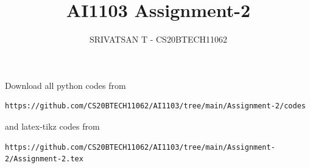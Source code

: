 \documentclass[journal,12pt,twocolumn]{IEEEtran}
\DeclareMathOperator*{\Res}{Res}
\begin{document}
\newcommand{\BEQA}{\begin{eqnarray}}
        \newcommand{\EEQA}{\end{eqnarray}}
\newcommand{\define}{\stackrel{\triangle}{=}}

\raggedbottom
\setlength{\parindent}{0pt}
\providecommand{\mbf}{\mathbf}
\providecommand{\pr}[1]{\ensuremath{\Pr\left(#1\right)}}
\providecommand{\qfunc}[1]{\ensuremath{Q\left(#1\right)}}
\providecommand{\sbrak}[1]{\ensuremath{{}\left[#1\right]}}
\providecommand{\lsbrak}[1]{\ensuremath{{}\left[#1\right.}}
\providecommand{\rsbrak}[1]{\ensuremath{{}\left.#1\right]}}
\providecommand{\brak}[1]{\ensuremath{\left(#1\right)}}
\providecommand{\lbrak}[1]{\ensuremath{\left(#1\right.}}
\providecommand{\rbrak}[1]{\ensuremath{\left.#1\right)}}
\providecommand{\cbrak}[1]{\ensuremath{\left\{#1\right\}}}
\providecommand{\lcbrak}[1]{\ensuremath{\left\{#1\right.}}
\providecommand{\rcbrak}[1]{\ensuremath{\left.#1\right\}}}
\theoremstyle{remark}
\newtheorem{rem}{Remark}
\newcommand{\sgn}{\mathop{\mathrm{sgn}}}
\providecommand{\abs}[1]{\vert#1\vert}
\providecommand{\res}[1]{\Res\displaylimits_{#1}}
\providecommand{\norm}[1]{\lVert#1\rVert}
\providecommand{\mtx}[1]{\mathbf{#1}}
\providecommand{\mean}[1]{E[#1]}
\providecommand{\fourier}{\overset{\mathcal{F}}{ \rightleftharpoons}}
\providecommand{\system}{\overset{\mathcal{H}}{ \longleftrightarrow}}
\newcommand{\solution}{\noindent \textbf{Solution: }}
\newcommand{\cosec}{\,\text{cosec}\,}
\newcommand{\comb}[2]{{}^{#1}\mathrm{C}_{#2}}
\providecommand{\dec}[2]{\ensuremath{\overset{#1}{\underset{#2}{\gtrless}}}}
\newcommand{\myvec}[1]{\ensuremath{\begin{pmatrix}#1\end{pmatrix}}}
\newcommand{\mydet}[1]{\ensuremath{\begin{vmatrix}#1\end{vmatrix}}}
\makeatletter
{}
\makeatother
\let\StandardTheFigure\thefigure
\let\vec\mathbf
\renewcommand{\thefigure}{\theproblem}
\def\putbox#1#2#3{\makebox[0in][l]{\makebox[#1][l]{}\raisebox{\baselineskip}[0in][0in]{\raisebox{#2}[0in][0in]{#3}}}}
\def\rightbox#1{\makebox[0in][r]{#1}}
\def\centbox#1{\makebox[0in]{#1}}
\def\topbox#1{\raisebox{-\baselineskip}[0in][0in]{#1}}
\def\midbox#1{\raisebox{-0.5\baselineskip}[0in][0in]{#1}}
\vspace{3cm}
\title{AI1103 Assignment-2}
\author{SRIVATSAN T - CS20BTECH11062}
\maketitle
\newpage
\bigskip
\renewcommand{\thefigure}{\theenumi}
\renewcommand{\thetable}{\theenumi}
Download all python codes from
\begin{lstlisting}
https://github.com/CS20BTECH11062/AI1103/tree/main/Assignment-2/codes
\end{lstlisting}
%
and latex-tikz codes from
%
\begin{lstlisting}
https://github.com/CS20BTECH11062/AI1103/tree/main/Assignment-2/Assignment-2.tex
\end{lstlisting}
\end{document}
